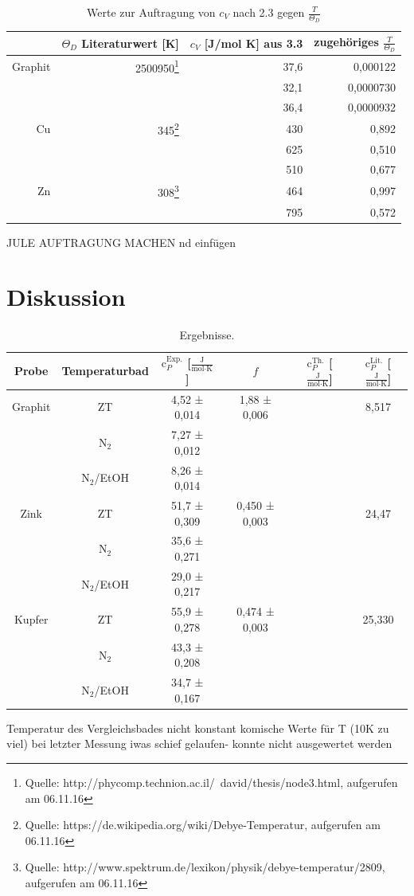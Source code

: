\documentclass[12pt,a4paper,titlepage,headinclude,bibtotoc]{scrartcl}
\begin{document}
\begin{table} [h]
\centering
\caption{Werte zur Auftragung von $c_V$ nach 2.3 gegen $\frac{T}{\Theta_D}$}
\begin{tabular} {r | r |r | r }
&$\Theta_D$ Literaturwert [K] &$c_V$ [J/mol K] aus 3.3& zugehöriges $\frac{T}{\Theta_D}$ \\
\hline
Graphit& 2500950\protect\footnote{Quelle: http://phycomp.technion.ac.il/~david/thesis/node3.html, aufgerufen am 06.11.16} &37,6&0,000122 \\
&&32,1& 0,0000730 \\
&&36,4& 0,0000932 \\
Cu&345\protect\footnote{Quelle: https://de.wikipedia.org/wiki/Debye-Temperatur, aufgerufen am 06.11.16} &430& 0,892 \\
&&625& 0,510\\
&&510& 0,677\\
Zn&308\protect\footnote{Quelle: http://www.spektrum.de/lexikon/physik/debye-temperatur/2809, aufgerufen am 06.11.16} &464& 0,997\\
&&795& 0,572\\
\end{tabular}
\end{table}

JULE AUFTRAGUNG MACHEN nd einfügen

\section{Diskussion}
\begin{table}[h!]
\centering
\caption{Ergebnisse.}
\begin{tabular}{c|c|c|c|c|c}
Probe&Temperaturbad&$\text{c}_P^{\text{Exp.}}$ [$\frac{\text{J}}{\text{mol}\cdot\text{K}}$] & $f$ &$\text{c}_P^{\text{Th.}}$ [$\frac{\text{J}}{\text{mol}\cdot\text{K}}$] &$\text{c}_P^{\text{Lit.}}$ [$\frac{\text{J}}{\text{mol}\cdot\text{K}}$] \\
\hline
Graphit& ZT&4,52 ± 0,014 &1,88 ± 0,006& &8,517 \\
\hline
&$\text{N}_2$&7,27 ± 0,012& & \\
\hline
&$\text{N}_2$/EtOH&8,26 ± 0,014 & &\\
\hline
Zink &ZT& 51,7 ± 0,309&  0,450 ± 0,003& &24,47\\
\hline
&$\text{N}_2$& 35,6 ± 0,271&&\\
\hline
&$\text{N}_2$/EtOH& 29,0 ± 0,217&&\\
\hline
Kupfer &ZT&55,9 ± 0,278& 0,474 ± 0,003& &25,330\\
\hline
&$\text{N}_2$&43,3 ± 0,208&&\\
\hline
&$\text{N}_2$/EtOH& 34,7 ± 0,167&&\\
\end{tabular}
\end{table}
\FloatBarrier
Temperatur des Vergleichsbades nicht konstant
komische Werte für T (10K zu viel)
bei letzter Messung iwas schief gelaufen- konnte nicht ausgewertet werden
\end{document}
